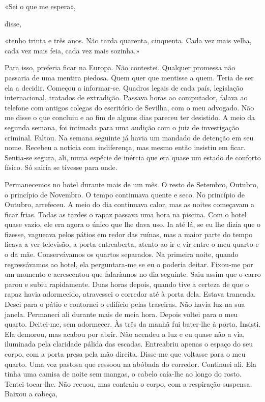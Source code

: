 «Sei o que me espera»,

disse,

«tenho trinta e três anos. Não tarda quarenta, cinquenta. Cada vez mais
velha, cada vez mais feia, cada vez mais sozinha.»

Para isso, preferia ficar na Europa. Não contestei. Qualquer promessa
não passaria de uma mentira piedosa. Quem quer que mentisse a quem.
Teria de ser ela a decidir. Começou a informar­‑se. Quadros legais de
cada país, legislação internacional, tratados de extradição. Passava
horas ao computador, falava ao telefone com antigos colegas do
escritório de Sevilha, com o meu advogado. Não me disse o que concluiu e
ao fim de alguns dias pareceu ter desistido. A meio da segunda semana,
foi intimada para uma audição com o juiz de investigação criminal.
Faltou. Na semana seguinte já havia um mandado de detenção em seu nome.
Recebeu a notícia com indiferença, mas mesmo então insistiu em ficar.
Sentia­‑se segura, ali, numa espécie de inércia que era quase um estado
de conforto físico. Só sairia se tivesse para onde.

Permanecemos no hotel durante mais de um mês. O resto de Setembro,
Outubro, o princípio de Novembro. O tempo continuava quente e seco. No
princípio de Outubro, arrefeceu. A meio do dia continuava calor, mas as
noites começavam a ficar frias. Todas as tardes o rapaz passava uma hora
na piscina. Com o hotel quase vazio, ele era agora o único que lhe dava
uso. Ia até lá, se eu lhe dizia que o fizesse, vagueava pelos pátios em
redor das ruínas, mas a maior parte do tempo ficava a ver televisão, a
porta entreaberta, atento ao ir e vir entre o meu quarto e o da mãe.
Conservávamos os quartos separados. Na primeira noite, quando
regressávamos ao hotel, ela perguntara­‑me se eu o poderia deitar.
Fixou­‑me por um momento e acrescentou que falaríamos no dia seguinte.
Saiu assim que o carro parou e subiu rapidamente. Duas horas depois,
quando tive a certeza de que o rapaz havia adormecido, atravessei o
corredor até à porta dela. Estava trancada. Desci para o pátio e
contornei o edifício pelas traseiras. Não havia luz na sua janela.
Permaneci ali durante mais de meia hora. Depois voltei para o meu
quarto. Deitei­‑me, sem adormecer. Às três da manhã fui bater­‑lhe à
porta. Insisti. Ela demorou, mas acabou por abrir. Não acendeu a luz e
eu quase não a via, iluminada pela claridade pálida das escadas.
Entreabriu apenas o espaço do seu corpo, com a porta presa pela mão
direita. Disse­‑me que voltasse para o meu quarto. Uma voz pastosa que
ressoou na abóbada do corredor. Continuei ali. Ela tinha uma camisa de
noite sem mangas, o cabelo caía­‑lhe ao longo do rosto. Tentei
tocar­‑lhe. Não recuou, mas contraiu o corpo, com a respiração suspensa.
Baixou a cabeça,

